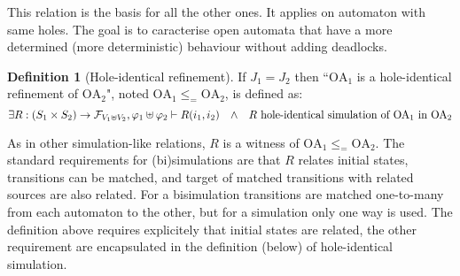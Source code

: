 \documentclass{article}
\theoremstyle{plain}
\theoremstyle{definition}
\newtheorem{defi}{Definition}
\newcommand\mpar[1]{{\left(#1\right)}}
\newcommand\qwedge{\DOTSB\quad{\wedge}\quad}
\newcommand\formulae{{\mathcal{F}}}
\begin{document}
This relation is the basis for all the other ones.
It applies on automaton with same holes.
The goal is to caracterise open automata that have a more determined (more deterministic) behaviour without adding deadlocks.
\begin{defi}[Hole-identical refinement]
If \(J_1 = J_2\) then ``\(\mathrm{OA}_1\) is a hole-identical refinement of \(\mathrm{OA}_2\)", noted \(\mathrm{OA}_1 \leq_= \mathrm{OA}_2\), is defined as:
\[ \exists R: \mpar{S_1 \times S_2} \to \formulae_{V_1 \uplus V_2}, \varphi_1 \uplus \varphi_2 \vdash R\mpar{i_1, i_2} \qwedge R \text{ hole-identical simulation of } \mathrm{OA}_1 \text{ in } \mathrm{OA}_2 \]
\end{defi}
As in other simulation-like relations, \(R\) is a witness of \(\mathrm{OA}_1 \leq_= \mathrm{OA}_2\).
The standard requirements for (bi)simulations are that \(R\) relates initial states, transitions can be matched, and target of matched transitions with related sources are also related.
For a bisimulation transitions are matched one-to-many from each automaton to the other, but for a simulation only one way is used.
The definition above requires explicitely that initial states are related, the other requirement are encapsulated in the definition (below) of hole-identical simulation.
\end{document}
